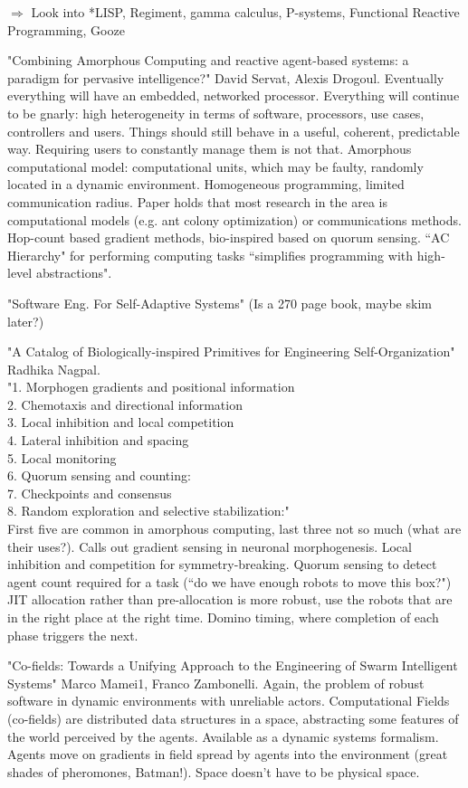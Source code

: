 \documentclass[]{article}
\begin{document}
$\Rightarrow$ Look into *LISP, Regiment, gamma calculus, P-systems, Functional Reactive Programming, Gooze

"Combining Amorphous Computing and reactive agent-based systems: a paradigm for pervasive intelligence?" David Servat, Alexis Drogoul. Eventually everything will have an embedded, networked processor. Everything will continue to be gnarly: high heterogeneity in terms of software, processors, use cases, controllers and users. Things should still behave in a useful, coherent, predictable way. Requiring users to constantly manage them is not that. Amorphous computational model: computational units, which may be faulty, randomly located in a dynamic environment. Homogeneous programming, limited communication radius. Paper holds that most research in the area is computational models (e.g. ant colony optimization) or communications methods. Hop-count based gradient methods, bio-inspired based on quorum sensing. ``AC Hierarchy" for performing computing tasks ``simplifies programming with high-level abstractions". 

"Software Eng. For Self-Adaptive Systems" (Is a 270 page book, maybe skim later?)

"A Catalog of Biologically-inspired Primitives for Engineering Self-Organization" \cite{nagpal2004catalog} Radhika Nagpal.\\ 
"1. Morphogen gradients and positional information \\
2. Chemotaxis and directional information \\
3. Local inhibition and local competition \\
4. Lateral inhibition and spacing \\
5. Local monitoring \\
6. Quorum sensing and counting: \\
7. Checkpoints and consensus \\
8. Random exploration and selective stabilization:"\\
First five are common in amorphous computing, last three not so much (what are their uses?). Calls out gradient sensing in neuronal morphogenesis. Local inhibition and competition for symmetry-breaking. Quorum sensing to detect agent count required for a task (``do we have enough robots to move this box?") JIT allocation rather than pre-allocation is more robust, use the robots that are in the right place at the right time. Domino timing, where completion of each phase triggers the next. 

"Co-fields: Towards a Unifying Approach to the Engineering of Swarm Intelligent Systems" \cite{mamei2003co} Marco Mamei1, Franco Zambonelli. Again, the problem of robust software in dynamic environments with unreliable actors. Computational Fields (co-fields) are distributed data structures in a space, abstracting some features of the world perceived by the agents. Available as a dynamic systems formalism. Agents move on gradients in field spread by agents into the environment (great shades of pheromones, Batman!). Space doesn't have to be physical space. 
\end{document}
